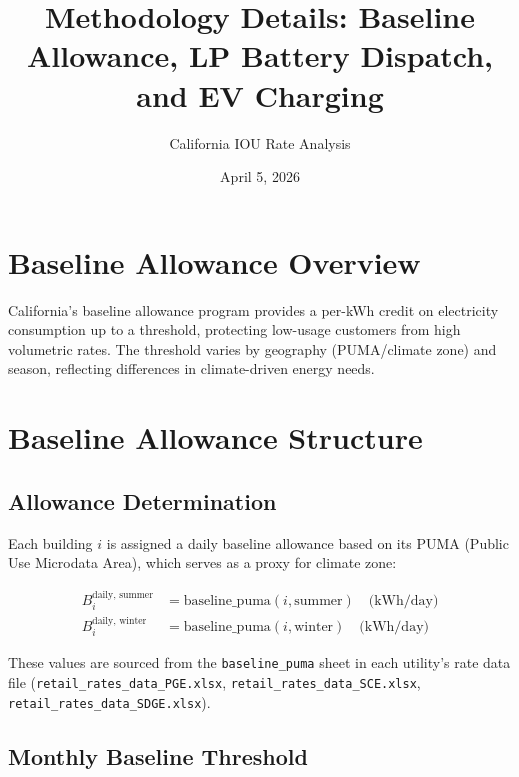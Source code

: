 \documentclass[11pt]{article}
\title{Methodology Details: Baseline Allowance, LP Battery Dispatch, and EV Charging}
\author{California IOU Rate Analysis}
\date{April 5, 2026}
\begin{document}
\maketitle

\section{Baseline Allowance Overview}

California's baseline allowance program provides a per-kWh credit on electricity consumption up to a threshold, protecting low-usage customers from high volumetric rates. The threshold varies by geography (PUMA/climate zone) and season, reflecting differences in climate-driven energy needs.

\section{Baseline Allowance Structure}

\subsection{Allowance Determination}

Each building $i$ is assigned a daily baseline allowance based on its PUMA (Public Use Microdata Area), which serves as a proxy for climate zone:

\begin{align}
    B_i^{\text{daily, summer}} &= \text{baseline\_puma}(i, \text{summer}) \quad \text{(kWh/day)} \\
    B_i^{\text{daily, winter}} &= \text{baseline\_puma}(i, \text{winter}) \quad \text{(kWh/day)}
\end{align}

These values are sourced from the \texttt{baseline\_puma} sheet in each utility's rate data file (\texttt{retail\_rates\_data\_PGE.xlsx}, \texttt{retail\_rates\_data\_SCE.xlsx}, \texttt{retail\_rates\_data\_SDGE.xlsx}).

\subsection{Monthly Baseline Threshold}
\end{document}
